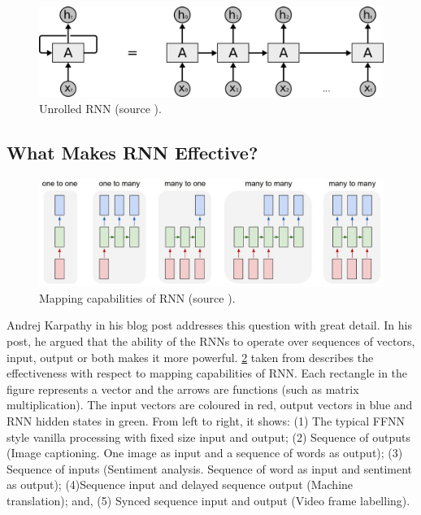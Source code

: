\begin{figure}
	\centering
	\includegraphics[width=.7\linewidth]{fig/neucube/RNN-unrolled.png}
	\caption{Unrolled RNN (source \citet{rnnexplanation}).}
	\label{fig:rnn_unrolled}
\end{figure}

\subsection{What Makes RNN Effective?}
\begin{figure}
	\centering
	\includegraphics[width=.7\linewidth]{fig/neucube/rnn_karpathy.jpeg}
	\caption{Mapping capabilities of RNN (source \citet{effectivernn}).}
	\label{fig:rnn_karpathy}
\end{figure}
Andrej Karpathy in his blog post \citep{effectivernn} addresses this question with great detail. In his post, he argued that the ability of the RNNs to operate over sequences of vectors, input, output or both makes it more powerful. \figurename \ref{fig:rnn_karpathy} taken from \citep{effectivernn} describes the effectiveness with respect to mapping capabilities of RNN. Each rectangle in the figure represents a vector and the arrows are functions (such as matrix multiplication). The input vectors are coloured in red, output vectors in blue and RNN hidden states in green. From left to right, it shows: (1) The typical FFNN style vanilla processing with fixed size input and output; (2) Sequence of outputs (Image captioning. One image as input and a sequence of words as output); (3) Sequence of inputs (Sentiment analysis. Sequence of word as input and sentiment as output); (4)Sequence input and delayed sequence output (Machine translation); and, (5)  Synced sequence input and output (Video frame labelling).

